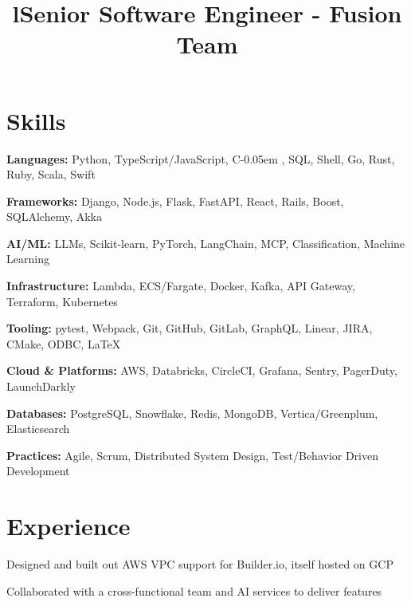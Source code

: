 \documentclass[12pt, line]{res}
\title{l}\dates{r}\\
\let\tempone\itemize
\let\temptwo\enditemize
\renewenvironment{itemize}{%
  \setlength{\topsep}{0pt}%
  \setlength{\partopsep}{0pt}%
  \tempone
  \renewcommand{\labelitemi}{$\bullet$}%
  \vspace{-0.25in}%
  \setlength{\itemsep}{3pt}%
  \setlength{\parsep}{0pt}%
}{%
  \temptwo
}
\newcommand{\Cpp}{C\kern-0.05em \raisebox{0.4ex}{\tiny\textbf{++}}}
\begin{document}

\begin{resume}

  \section{Skills}
  \vspace{0.50in} %
  \begin{itemize}
    \item \textbf{Languages:} Python, TypeScript/JavaScript, \Cpp, SQL, Shell, Go, Rust, Ruby, Scala, Swift
    \item \textbf{Frameworks:} Django, Node.js, Flask, FastAPI, React, Rails, Boost, SQLAlchemy, Akka
    \item \textbf{AI/ML:} LLMs, Scikit-learn, PyTorch, LangChain, MCP, Classification, Machine Learning
    \item \textbf{Infrastructure:} Lambda, ECS/Fargate, Docker, Kafka, API Gateway, Terraform, Kubernetes
    \item \textbf{Tooling:} pytest, Webpack, Git, GitHub, GitLab, GraphQL, Linear, JIRA, CMake, ODBC, \LaTeX
    \item \textbf{Cloud \& Platforms:} AWS, Databricks, CircleCI, Grafana, Sentry, PagerDuty, LaunchDarkly
    \item \textbf{Databases:} PostgreSQL, Snowflake, Redis, MongoDB, Vertica/Greenplum, Elasticsearch
    \item \textbf{Practices:} Agile, Scrum, Distributed System Design, Test/Behavior Driven Development
  \end{itemize}

  \section{Experience}
  \vspace{0.10in}

  \title{Senior Software Engineer - Fusion Team}
  \begin{position}
    \begin{itemize}
      \item Designed and built out AWS VPC support for Builder.io, itself hosted on GCP
      \item Collaborated with a cross-functional team and AI services to deliver features
    \end{itemize}
  \end{position}


\end{resume}
\end{document}
